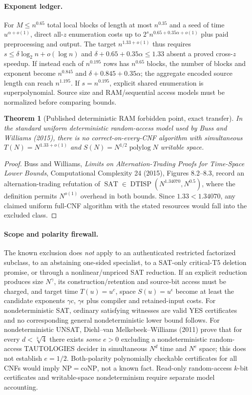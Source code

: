 \documentclass[11pt]{article}
\newtheorem{theorem}{Theorem}
\begin{document}
\paragraph{Exponent ledger.}
For $M\le n^{0.65}$ total local blocks of length at most $n^{0.35}$
and a seed of time $u^{\alpha+o(1)}$, direct all-$z$ enumeration costs up to
$2^s n^{0.65+0.35\alpha+o(1)}$ plus paid preprocessing and output.
The target $n^{1.33+o(1)}$ thus requires
$s\le\delta\log_2 n+o(\log n)$ and
$\delta+0.65+0.35\alpha\le1.33$ absent a proved cross-$z$ speedup.
If instead each of $n^{0.195}$ rows has $n^{0.65}$ blocks, the
number of blocks and exponent become $n^{0.845}$ and
$\delta+0.845+0.35\alpha$; the aggregate encoded source length can
reach $n^{1.195}$. If $s=n^{0.195}$, explicit shared enumeration
is superpolynomial. Source size and RAM/sequential access models
must be normalized before comparing bounds.

\begin{theorem}[Published deterministic RAM forbidden point, exact transfer]
In the standard uniform deterministic random-access model used by
Buss and Williams (2015), there is no correct-on-every-CNF algorithm
with simultaneous $T(N)=N^{1.33+o(1)}$ and
$S(N)=N^{1/2}\operatorname{polylog}N$ writable space.
\end{theorem}
\begin{proof}
Buss and Williams, \emph{Limits on Alternation-Trading Proofs for
Time-Space Lower Bounds}, Computational Complexity 24 (2015),
Figures 8.2--8.3, record an alternation-trading refutation of
$\operatorname{SAT}\in\operatorname{DTISP}(N^{1.34070},N^{0.5})$,
where the definition permits $N^{o(1)}$ overhead in both bounds.
Since $1.33<1.34070$, any claimed uniform full-CNF algorithm with the
stated resources would fall into the excluded class.
\end{proof}

\paragraph{Scope and polarity firewall.}
The known exclusion does \emph{not} apply to an authenticated restricted
factorized subclass, to an abstaining one-sided specialist, to a
SAT-only critical-T5 deletion promise, or through a nonlinear/unpriced
SAT reduction. If an explicit reduction produces size $N^\gamma$,
its construction/retention and source-bit access must be charged,
and target time $T(u)=u^c$, space $S(u)=u^\epsilon$ become at least
the candidate exponents $\gamma c$, $\gamma\epsilon$ plus compiler
and retained-input costs. For nondeterministic SAT, ordinary satisfying
witnesses are valid YES certificates and no corresponding general
nondeterministic lower bound follows. For nondeterministic UNSAT,
Diehl--van Melkebeek--Williams (2011) prove that for every
$d<\sqrt[3]{4}$ there exists \emph{some} $e>0$ excluding a
nondeterministic random-access TAUTOLOGIES decider in simultaneous
$N^d$ time and $N^e$ space; this does not establish $e=1/2$.
Both-polarity polynomially checkable certificates for all CNFs
would imply $\mathrm{NP}=\mathrm{coNP}$, not a known fact.
Read-only random-access $k$-bit certificates and writable-space
nondeterminism require separate model accounting.
\end{document}
